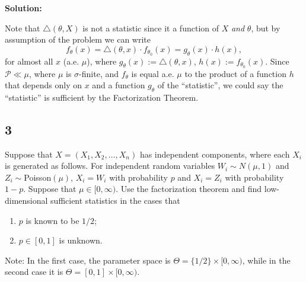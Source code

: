 \documentclass[12pt]{article}
\begin{document}
{\bf Solution:}

Note that $\triangle(\theta, X)$ is not a statistic since it a function of $X$ \emph{and} $\theta$, but by assumption of the problem we can write
\[ 
  f_{\theta}(x) = \triangle(\theta, x)\cdot f_{\theta_{0}}(x) = g_{\theta}(x) \cdot h(x),
\]
for almost all $x$ (a.e. $\mu$), where $g_{\theta}(x) := \triangle(\theta, x)$, $h(x) := f_{\theta_0}(x)$. Since $\mathcal{P} \ll \mu$, where $\mu$ is
$\sigma$-finite, and $f_{\theta}$ is equal a.e. $\mu$ to the product of a function $h$ that depends only on $x$ and a function $g_{\theta}$ of the
``statistic'', we could say the ``statistic'' is sufficient by the Factorization Theorem.


\newpage
\subsection*{3}
\begin{tcolorbox}
  Suppose that $X=(X_1,X_2,\ldots,X_n)$ has independent components, where each $X_i$ is generated as follows.  For independent random variables $W_i\sim N(\mu,1)$  and $Z_i \sim $Poisson$(\mu)$, $X_i=W_i$ with probability $p$ and $X_i=Z_i$ with probability $1-p$.  Suppose that $\mu\in[0,\infty)$.  Use the factorization theorem and find low-dimensional sufficient statistics in the cases that
  \begin{enumerate}
    \item $p$ is known to be $1/2$;
    \item $p\in[0,1]$ is unknown.
  \end{enumerate}
  Note: In the first case, the parameter space is $\Theta =\{1/2\}\times [0,\infty)$, while in the second case it is  $\Theta =[0,1]\times [0,\infty)$.
\end{tcolorbox}
\end{document}
